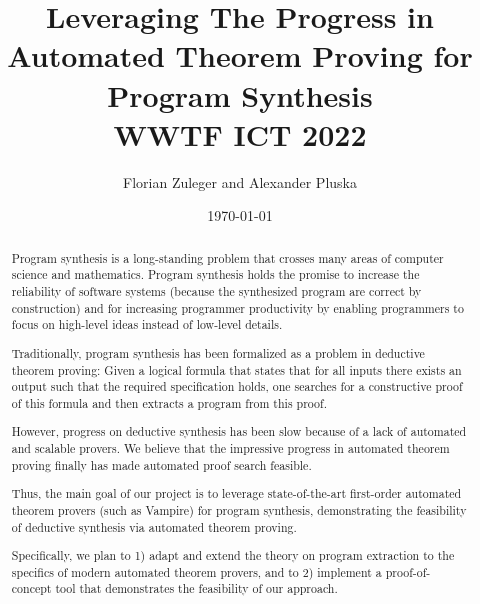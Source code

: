 \documentclass[a4paper,12pt]{article}
\begin{document}
\title{Leveraging The Progress in Automated Theorem Proving for Program Synthesis\\
\small{WWTF ICT 2022}}
\author{Florian Zuleger and Alexander Pluska}
\date{\today}
\maketitle


\begin{abstract}

  Program synthesis is a long-standing problem that crosses many areas of computer science and mathematics.
  Program synthesis holds the promise to  increase the reliability of software systems (because the synthesized program are correct by construction) and for increasing programmer productivity by enabling programmers to focus on high-level ideas instead of low-level details.

  Traditionally, program synthesis has been formalized as a problem in deductive theorem proving:
  Given a logical formula that states that for all inputs there exists an output such that the required specification holds, one searches for a constructive proof of this formula and then extracts a program from this proof.

  However, progress on deductive synthesis has been slow because of a lack of automated and scalable provers.
  We believe that the impressive progress in automated theorem proving finally has made automated proof search feasible.

  Thus, the main goal of our project is to leverage state-of-the-art first-order automated theorem provers (such as Vampire) for program synthesis, demonstrating the feasibility of deductive synthesis via automated theorem proving.

  Specifically, we plan to 1) adapt and extend the theory on program extraction to the specifics of modern automated theorem provers, and to 2) implement a proof-of-concept tool that demonstrates the feasibility of our approach.
\end{abstract}
\end{document}

